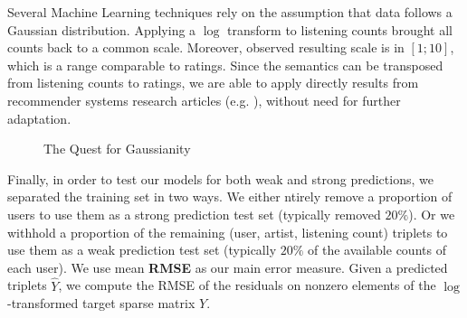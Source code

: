 \documentclass[10pt,a4paper]{article}
\begin{document}
  Several Machine Learning techniques rely on the assumption that data follows a Gaussian distribution. Applying a $\log$ transform to listening counts brought all counts back to a common scale. Moreover, observed resulting scale is in $[1;10]$, which is a range comparable to ratings. Since the semantics can be transposed from listening counts to ratings, we are able to apply directly results from recommender systems research articles (e.g. \cite{alswr}), without need for further adaptation.

  \begin{figure}[ht]
    \center
    \caption{The Quest for Gaussianity}
    \label{fig:recommendation-normalization}
  \end{figure}

  Finally, in order to test our models for both weak and strong predictions, we separated the training set in two ways. We either ntirely remove a proportion of users to use them as a strong prediction test set (typically removed $20\%$). Or we withhold a proportion of the remaining (user, artist, listening count) triplets to use them as a weak prediction test set (typically $20\%$ of the available counts of each user). We use mean \textbf{RMSE} as our main error measure. Given a predicted triplets $\hat{Y}$, we compute the RMSE of the residuals on nonzero elements of the $\log$-transformed target sparse matrix $Y$.
\end{document}
